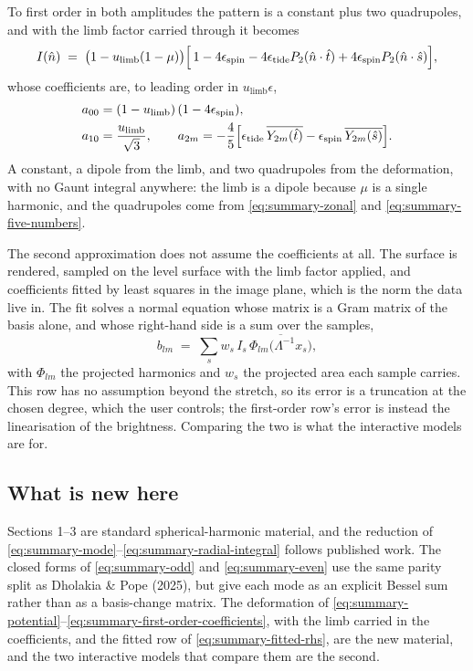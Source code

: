 To first order in both amplitudes the pattern is a constant plus two quadrupoles, and with
the limb factor carried through it becomes
\begin{equation}
  I(\hat n) \;=\; \bigl(1 - u_\text{limb}(1-\mu)\bigr)\Bigl[\,1 - 4\epsilon_\text{spin}
  - 4\epsilon_\text{tide}P_2(\hat n\cdot\hat t)
  + 4\epsilon_\text{spin}P_2(\hat n\cdot\hat s)\Bigr] ,
  \label{eq:summary-first-order}
\end{equation}
whose coefficients are, to leading order in $u_\text{limb}\epsilon$,
\begin{equation}
  \begin{aligned}
    a_{00} &= (1-u_\text{limb})\,(1-4\epsilon_\text{spin}) , \\
    a_{10} &= \frac{u_\text{limb}}{\sqrt3} , \qquad
    a_{2m} = -\frac{4}{5}\Bigl[\epsilon_\text{tide}\,\overline{Y_{2m}(\hat t)}
    - \epsilon_\text{spin}\,\overline{Y_{2m}(\hat s)}\Bigr] .
  \end{aligned}
  \label{eq:summary-first-order-coefficients}
\end{equation}
A constant, a dipole from the limb, and two quadrupoles from the deformation, with no Gaunt
integral anywhere: the limb is a dipole because $\mu$ is a single harmonic, and the
quadrupoles come from \eqref{eq:summary-zonal} and \eqref{eq:summary-five-numbers}.

The second approximation does not assume the coefficients at all.  The surface is rendered,
sampled on the level surface with the limb factor applied, and coefficients fitted by least
squares in the image plane, which is the norm the data live in.  The fit solves a normal
equation whose matrix is a Gram matrix of the basis alone, and whose right-hand side is a sum
over the samples,
\begin{equation}
  b_{lm} \;=\; \sum_s w_s\, I_s\, \overline{\Phi_{lm}\bigl(\Lambda^{-1}x_s\bigr)} ,
  \label{eq:summary-fitted-rhs}
\end{equation}
with $\Phi_{lm}$ the projected harmonics and $w_s$ the projected area each sample carries.
This row has no assumption beyond the stretch, so its error is a truncation at the chosen
degree, which the user controls; the first-order row's error is instead the linearisation of
the brightness.  Comparing the two is what the interactive models are for.



\subsection{What is new here}

Sections 1--3 are standard spherical-harmonic material, and the reduction of
\eqref{eq:summary-mode}--\eqref{eq:summary-radial-integral} follows published work.  The
closed forms of \eqref{eq:summary-odd} and \eqref{eq:summary-even} use the same parity split
as Dholakia \& Pope (2025), but give each mode as an explicit Bessel sum rather than as a
basis-change matrix.  The deformation of
\eqref{eq:summary-potential}--\eqref{eq:summary-first-order-coefficients}, with the limb
carried in the coefficients, and the fitted row of \eqref{eq:summary-fitted-rhs}, are the new
material, and the two interactive models that compare them are the second.
